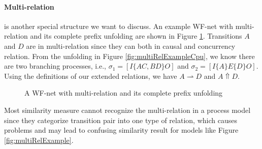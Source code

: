 \documentclass{llncs}
\begin{document}
\paragraph{Multi-relation} is another special structure we want to discuss. An example WF-net with multi-relation and its complete prefix unfolding are shown in Figure \ref{fig:exampleMultiRelation}. Transitions $A$ and $D$ are in multi-relation since they can both in causal and concurrency relation. From the unfolding in Figure \ref{fig:multiRelExampleCpu}, we know there are two branching processes, i.e., $\sigma_{1}=[I\{AC,BD\}O]$ and $\sigma_{2}=[I\{A\}E\{D\}O]$. Using the definitions of our extended relations, we have $A\rightharpoonup D$ and $A\Uparrow D$.

\begin{figure}[ht]
\centering
{}
\caption{A WF-net with multi-relation and its complete prefix unfolding\label{fig:exampleMultiRelation}}
\end{figure}

Most similarity measure cannot recognize the multi-relation in a process model since they categorize transition pair into one type of relation, which causes problems and may lead to confusing similarity result for models like Figure \ref{fig:multiRelExample}.
\end{document}
